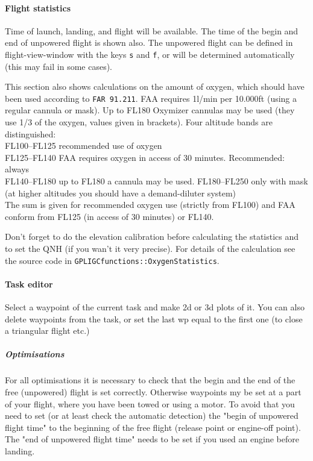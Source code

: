 \paragraph{Flight statistics}
Time of launch, landing, and flight will be available.
The time of the begin and end of unpowered flight is shown also. 
The unpowered flight can be defined in flight-view-window with the keys \texttt{s} and \texttt{f}, or will be determined automatically (this may fail in some cases).

This section also shows calculations on the amount of oxygen, which should have been used according to \texttt{FAR 91.211}.
FAA requires 1l/min per 10.000ft (using a regular cannula or mask). Up to FL180 Oxymizer cannulas may be used (they use 1/3 of the oxygen, values given in brackets).
Four altitude bands are distinguished: \\
FL100--FL125 recommended use of oxygen\\
FL125--FL140 FAA requires oxygen in access of 30 minutes. Recommended: always \\
FL140--FL180 up to FL180 a cannula may be used.
FL180--FL250 only with mask (at higher altitudes you should have a demand-diluter system)\\

The sum is given for recommended oxygen use (strictly from FL100) and FAA conform from FL125 (in access of 30 minutes) or FL140.

Don't forget to do the elevation calibration before calculating the statistics and to set the QNH (if you wan't it very precise).
For details of the calculation see the source code in \texttt{GPLIGCfunctions::OxygenStatistics}.


\paragraph{Task editor}
Select a waypoint of the current task and make 2d or 3d plots of it.
You can also delete waypoints from the task, or set the last wp equal to the first
one (to close a triangular flight etc.)


\subparagraph{Optimisations} \label{optimise} For all optimisations it is necessary to check that the begin and the end of the free (unpowered) flight is set correctly.
Otherwise waypoints my be set at a part of your flight, where you have been towed or using a motor.
To avoid that you need to set (or at least check the automatic detection) the "begin of unpowered flight time" to the beginning of the free flight (release point or engine-off point). The "end of unpowered flight time" needs to be set if you used an engine before landing.

